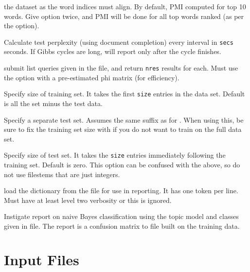 \documentclass[a4paper,english]{article}
\begin{document}
\begin{Description}
the dataset as the word indices must align.
By default, PMI computed for top 10 words.
Give option twice, and PMI will be done for all top words
ranked (as per the  option).
\item[\OptArg{-P}{secs}]  
Calculate test perplexity (using document completion)
every interval in \texttt{secs} seconds.  If Gibbs cycles are long,
will report only after the cycle finishes.
\item[\OptArg{-Q}{nres,file}]  
submit list queries given in the file, and return \texttt{nres}
results for each.  Must use the  option with
a pre-estimated phi matrix (for efficiency).
\item[\OptArg{-t}{size}]  Specify size of training set.  It takes the
first \texttt{size} entries in the data set. Default is all the
set minus the test data.
\item[\OptArg{-T}{filestem}]  Specify a separate test set.  
Assumes the same suffix as for .
When using this, be sure to fix the training set size with 
 if you do not want to train on the full
data set.
\item[\OptArg{-T}{size}]  Specify size of test set.  It takes the
\texttt{size} entries immediately following the training set. 
Default is zero.  This option can be confused with the above, so do not use 
filestems that are just integers.
\item[\Opt{-V}]  load the dictionary from the
 file for use in reporting.  It has one token per line.
Must have at least level two verbosity or this is ignored.
\item[\Opt{-X}]  Instigate report on naive Bayes classification
using the topic model and classes given in  file.
The report is a confusion matrix to file  built on
the training data.
\end{Description}

\section{Input Files}
\end{document}
